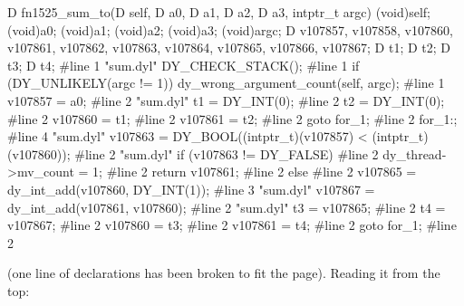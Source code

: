 \begin{ccode}
D fn1525_sum_to(D self, D a0, D a1, D a2, D a3, intptr_t argc) {
    (void)self; (void)a0; (void)a1; (void)a2; (void)a3; (void)argc;
    D v107857, v107858, v107860, v107861, v107862, v107863, v107864,
      v107865, v107866, v107867;
    D t1;
    D t2;
    D t3;
    D t4;
#line 1 "sum.dyl"
    DY_CHECK_STACK();
#line 1
    if (DY_UNLIKELY(argc != 1)) dy_wrong_argument_count(self, argc);
#line 1
    v107857 = a0;
#line 2 "sum.dyl"
    t1 = DY_INT(0);
#line 2
    t2 = DY_INT(0);
#line 2
    v107860 = t1;
#line 2
    v107861 = t2;
#line 2
    goto for_1;
#line 2
    for_1:;
#line 4 "sum.dyl"
    v107863 = DY_BOOL((intptr_t)(v107857) < (intptr_t)(v107860));
#line 2 "sum.dyl"
    if (v107863 != DY_FALSE) {
#line 2
        dy_thread->mv_count = 1;
#line 2
        return v107861;
#line 2
    } else {
#line 2
        v107865 = dy_int_add(v107860, DY_INT(1));
#line 3 "sum.dyl"
        v107867 = dy_int_add(v107861, v107860);
#line 2 "sum.dyl"
        t3 = v107865;
#line 2
        t4 = v107867;
#line 2
        v107860 = t3;
#line 2
        v107861 = t4;
#line 2
        goto for_1;
#line 2
    }
}
\end{ccode}

\noindent (one line of declarations has been broken to fit the page).
Reading it from the top:

